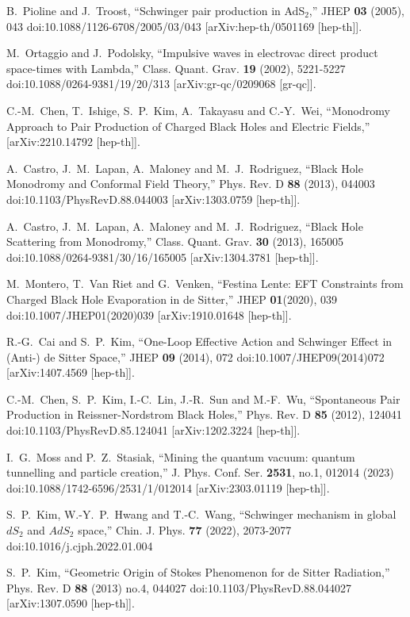 \documentclass[aps,nofootinbib,superscriptaddress
]{revtex4}
\begin{document}
\begin{thebibliography}{99}
B.~Pioline and J.~Troost,
``Schwinger pair production in AdS$_2$,''
JHEP \textbf{03} (2005), 043
doi:10.1088/1126-6708/2005/03/043
[arXiv:hep-th/0501169 [hep-th]].

M.~Ortaggio and J.~Podolsky,
``Impulsive waves in electrovac direct product space-times with Lambda,''
Class. Quant. Grav. \textbf{19} (2002), 5221-5227
doi:10.1088/0264-9381/19/20/313
[arXiv:gr-qc/0209068 [gr-qc]].


C.-M.~Chen, T.~Ishige, S.~P.~Kim, A.~Takayasu and C.-Y.~Wei,
``Monodromy Approach to Pair Production of Charged Black Holes and Electric Fields,''
[arXiv:2210.14792 [hep-th]].

A.~Castro, J.~M.~Lapan, A.~Maloney and M.~J.~Rodriguez,
``Black Hole Monodromy and Conformal Field Theory,''
Phys. Rev. D \textbf{88} (2013), 044003
doi:10.1103/PhysRevD.88.044003
[arXiv:1303.0759 [hep-th]].

A.~Castro, J.~M.~Lapan, A.~Maloney and M.~J.~Rodriguez,
``Black Hole Scattering from Monodromy,''
Class. Quant. Grav. \textbf{30} (2013), 165005
doi:10.1088/0264-9381/30/16/165005
[arXiv:1304.3781 [hep-th]].

M.~Montero, T.~Van Riet and G.~Venken,
``Festina Lente: EFT Constraints from Charged Black Hole Evaporation in de Sitter,''
JHEP \textbf{01}(2020), 039
doi:10.1007/JHEP01(2020)039
[arXiv:1910.01648 [hep-th]].

R.-G.~Cai and S.~P.~Kim,
``One-Loop Effective Action and Schwinger Effect in (Anti-) de Sitter Space,''
JHEP \textbf{09} (2014), 072
doi:10.1007/JHEP09(2014)072
[arXiv:1407.4569 [hep-th]].


C.-M.~Chen, S.~P.~Kim, I.-C.~Lin, J.-R.~Sun and M.-F.~Wu,
``Spontaneous Pair Production in Reissner-Nordstrom Black Holes,''
Phys. Rev. D \textbf{85} (2012), 124041
doi:10.1103/PhysRevD.85.124041
[arXiv:1202.3224 [hep-th]].

I.~G.~Moss and P.~Z.~Stasiak,
``Mining the quantum vacuum: quantum tunnelling and particle creation,''
J. Phys. Conf. Ser. \textbf{2531}, no.1, 012014 (2023)
doi:10.1088/1742-6596/2531/1/012014
[arXiv:2303.01119 [hep-th]].

S.~P.~Kim, W.-Y.~P.~Hwang and T.-C.~Wang,
``Schwinger mechanism in global $dS_2$ and $AdS_2$ space,''
Chin. J. Phys. \textbf{77} (2022), 2073-2077
doi:10.1016/j.cjph.2022.01.004

S.~P.~Kim,
``Geometric Origin of Stokes Phenomenon for de Sitter Radiation,''
Phys. Rev. D \textbf{88} (2013) no.4, 044027
doi:10.1103/PhysRevD.88.044027
[arXiv:1307.0590 [hep-th]].



\end{thebibliography}
\end{document}
